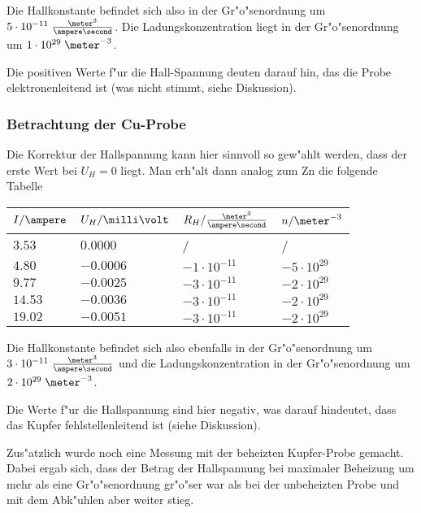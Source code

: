\documentclass[a4paper,10pt]{article}
\begin{document}
Die Hallkonstante befindet sich also in der Gr"o"senordnung um $5 \cdot 10^{-11} \; \frac{\meter^3}{\ampere \second}$. Die Ladungskonzentration liegt in der Gr"o"senordnung um $1 \cdot 10^{29} \; \meter^{-3}$.

Die positiven Werte f"ur die Hall-Spannung deuten darauf hin, das die Probe elektronenleitend ist (was nicht stimmt, siehe Diskussion).

\subsubsection*{Betrachtung der Cu-Probe}
Die Korrektur der Hallspannung kann hier sinnvoll so gew"ahlt werden, dass der erste Wert bei $U_H = 0$ liegt. Man erh"alt dann analog zum Zn die folgende Tabelle
\begin{center}
\begin{tabular}{|l|l|l|l|}
\hline
$I / \ampere$ & $U_H / \milli\volt$ & $R_H / \frac{\meter^3}{\ampere \second}$ & $n / \meter^{-3}$ \\
\hline
$3.53$ & $0.0000$ & / & / \\
$4.80$ & $-0.0006$ & $-1 \cdot 10^{-11}$ & $-5 \cdot 10^{29}$ \\
$9.77$ & $-0.0025$ & $-3 \cdot 10^{-11}$ & $-2 \cdot 10^{29}$ \\
$14.53$ & $-0.0036$ & $-3 \cdot 10^{-11}$ & $-2 \cdot 10^{29}$ \\
$19.02$ & $-0.0051$ & $-3 \cdot 10^{-11}$ & $-2 \cdot 10^{29}$\\
\hline
\end{tabular}
\end{center}

Die Hallkonstante befindet sich also ebenfalls in der Gr"o"senordnung um $3 \cdot 10^{-11} \; \frac{\meter^3}{\ampere \second}$ und die Ladungskonzentration in der Gr"o"senordnung um $2 \cdot 10^{29} \; \meter^{-3}$.

Die Werte f"ur die Hallspannung sind hier negativ, was darauf hindeutet, dass das Kupfer fehlstellenleitend ist (siehe Diskussion).

Zus"atzlich wurde noch eine Messung mit der beheizten Kupfer-Probe gemacht. Dabei ergab sich, dass der Betrag der Hallspannung bei maximaler Beheizung um mehr als eine Gr"o"senordnung gr"o"ser war als bei der unbeheizten Probe und mit dem Abk"uhlen aber weiter stieg.
\end{document}

